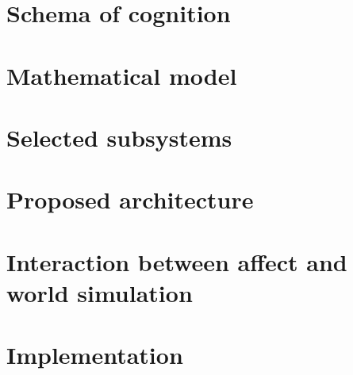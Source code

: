 \documentclass[]{scrartcl}
\begin{document}
\section{Schema of cognition}\label{sec:schemaOfCognition}



\section{Mathematical model}\label{sec:mathematicalModel}



\section{Selected subsystems}\label{sec:selectedSubsystems}



\section{Proposed architecture}\label{sec:proposedArchitecture}

\section{Interaction between affect and world simulation}



\section{Implementation}



\endgroup

\pagebreak

\nocite{*}



\end{document}
